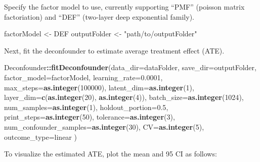 \documentclass[]{article}
\newenvironment{Shaded}{\begin{snugshade}}{\end{snugshade}}
\newcommand{\DataTypeTok}[1]{\textcolor[rgb]{0.13,0.29,0.53}{#1}}
\newcommand{\DecValTok}[1]{\textcolor[rgb]{0.00,0.00,0.81}{#1}}
\newcommand{\FloatTok}[1]{\textcolor[rgb]{0.00,0.00,0.81}{#1}}
\newcommand{\KeywordTok}[1]{\textcolor[rgb]{0.13,0.29,0.53}{\textbf{#1}}}
\newcommand{\NormalTok}[1]{#1}
\newcommand{\OperatorTok}[1]{\textcolor[rgb]{0.81,0.36,0.00}{\textbf{#1}}}
\newcommand{\StringTok}[1]{\textcolor[rgb]{0.31,0.60,0.02}{#1}}
\begin{document}
Specify the factor model to use, currently supporting ``PMF'' (poisson
matrix factoriation) and ``DEF'' (two-layer deep exponential family).

\begin{Shaded}
\begin{Highlighting}[]
\NormalTok{factorModel \textless{}{-}}\StringTok{ \textquotesingle{}DEF\textquotesingle{}}
\NormalTok{outputFolder \textless{}{-}}\StringTok{ "path/to/outputFolder"}
\end{Highlighting}
\end{Shaded}

Next, fit the deconfounder to estimate average treatment effect (ATE).

\begin{Shaded}
\begin{Highlighting}[]
\NormalTok{Deconfounder}\OperatorTok{::}\KeywordTok{fitDeconfounder}\NormalTok{(}\DataTypeTok{data\_dir=}\NormalTok{dataFolder,}
                \DataTypeTok{save\_dir=}\NormalTok{outputFolder,}
                \DataTypeTok{factor\_model=}\NormalTok{factorModel,}
                \DataTypeTok{learning\_rate=}\FloatTok{0.0001}\NormalTok{,}
                \DataTypeTok{max\_steps=}\KeywordTok{as.integer}\NormalTok{(}\DecValTok{100000}\NormalTok{),}
                \DataTypeTok{latent\_dim=}\KeywordTok{as.integer}\NormalTok{(}\DecValTok{1}\NormalTok{), }
                \DataTypeTok{layer\_dim=}\KeywordTok{c}\NormalTok{(}\KeywordTok{as.integer}\NormalTok{(}\DecValTok{20}\NormalTok{), }\KeywordTok{as.integer}\NormalTok{(}\DecValTok{4}\NormalTok{)), }
                \DataTypeTok{batch\_size=}\KeywordTok{as.integer}\NormalTok{(}\DecValTok{1024}\NormalTok{),}
                \DataTypeTok{num\_samples=}\KeywordTok{as.integer}\NormalTok{(}\DecValTok{1}\NormalTok{), }
                \DataTypeTok{holdout\_portion=}\FloatTok{0.5}\NormalTok{, }
                \DataTypeTok{print\_steps=}\KeywordTok{as.integer}\NormalTok{(}\DecValTok{50}\NormalTok{),}
                \DataTypeTok{tolerance=}\KeywordTok{as.integer}\NormalTok{(}\DecValTok{3}\NormalTok{), }
                \DataTypeTok{num\_confounder\_samples=}\KeywordTok{as.integer}\NormalTok{(}\DecValTok{30}\NormalTok{), }
                \DataTypeTok{CV=}\KeywordTok{as.integer}\NormalTok{(}\DecValTok{5}\NormalTok{), }
                \DataTypeTok{outcome\_type=}\StringTok{\textquotesingle{}linear\textquotesingle{}}
\NormalTok{)}
\end{Highlighting}
\end{Shaded}

To visualize the estimated ATE, plot the mean and 95 CI as follows:
\end{document}
